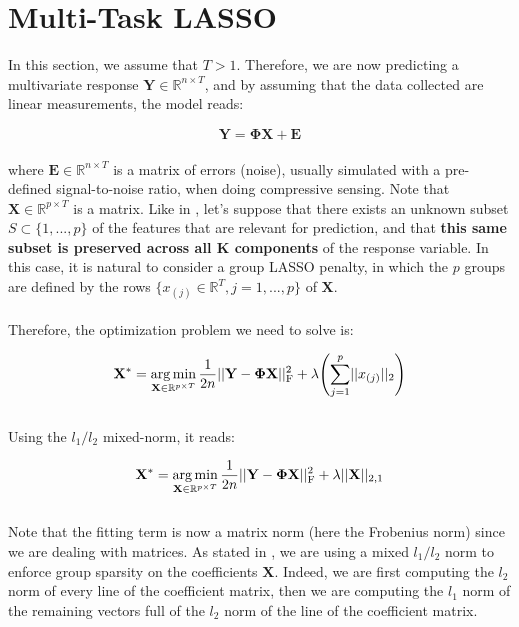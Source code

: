 \documentclass[a4paper,10pt]{article}
\theoremstyle{definition}
\begin{document}
\section{Multi-Task LASSO}
\label{section_4}

In this section, we assume that $T > 1$. Therefore, we are now predicting a multivariate response $\mathbf{Y}\in \mathbb{R}^{n \times T}$, and by assuming that the data collected are linear measurements, the model reads:

\begin{equation*}
    \mathbf{Y} = \mathbf{\Phi}\mathbf{X} + \mathbf{E}
\end{equation*}
\\
where $\mathbf{E} \in \mathbb{R}^{n \times T}$ is a matrix of errors (noise), usually simulated with a pre-defined signal-to-noise ratio, when doing compressive sensing. Note that $\mathbf{X} \in \mathbb{R}^{p \times T}$ is a matrix.
Like in , let's suppose that there exists an unknown subset $S \subset  \{1, ..., p\}$ of the features that are relevant for prediction, and that \textbf{this same subset is preserved across all K components} of the response
variable. In this case, it is natural to consider a group LASSO penalty, in which the $p$ groups are defined by the rows $\{x_{(j)} \in \mathbb{R}^T, j=1,...,p\}$ of $\mathbf{X}$. 
\\
\\
Therefore, the optimization problem we need to solve is:

\begin{equation*}
    \mathbf{X}^* = \operatorname*{arg\,min}_{\mathbf{X} \in \mathbb{R}^{p \times T}} \frac{1}{2n} \lvert\lvert \mathbf{Y} - \mathbf{\Phi X} \rvert\rvert_{\text{F}}^2 + \lambda \Biggl( \sum_{j=1}^p \lvert\lvert x_{(j)} \rvert\rvert_2 \Biggr)
\end{equation*}
\\
Using the $l_1/l_2$ mixed-norm, it reads:

\begin{equation*}
    \mathbf{X}^* = \operatorname*{arg\,min}_{\mathbf{X} \in \mathbb{R}^{p \times T}} \frac{1}{2n} \lvert\lvert \mathbf{Y} - \mathbf{\Phi X} \rvert\rvert_{\text{F}}^2 + \lambda \lvert\lvert \mathbf{X} \rvert\rvert_{2, 1}
\end{equation*}
\\
Note that the fitting term is now a matrix norm (here the Frobenius norm) since we are dealing with matrices. As stated in , we are using a mixed $l_1/l_2$ norm to enforce group sparsity on the coefficients $\mathbf{X}$. Indeed,
we are first computing the $l_2$ norm of every line of the coefficient matrix, then we are computing the $l_1$ norm of the remaining vectors full of the $l_2$ norm of the line of the coefficient matrix.
\end{document}
